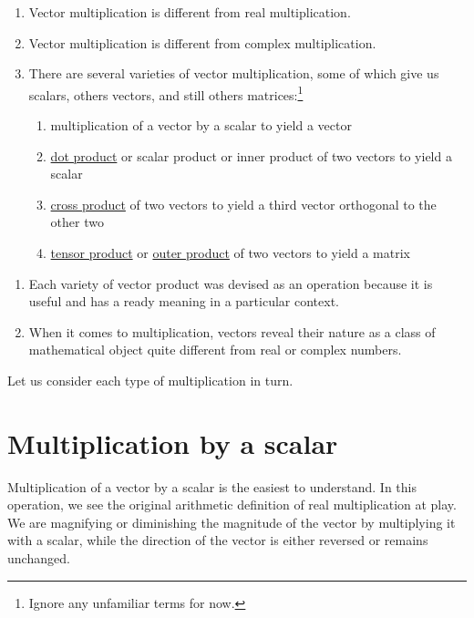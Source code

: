 \documentclass[
  a4paper,
]{article}
\providecommand{\tightlist}{%
  \setlength{\itemsep}{0pt}\setlength{\parskip}{0pt}}
\begin{document}
\begin{enumerate}
\def\labelenumi{\arabic{enumi}.}
\item
  Vector multiplication is different from real multiplication.
\item
  Vector multiplication is different from complex multiplication.
\item
  There are several varieties of vector multiplication, some of which
  give us scalars, others vectors, and still others matrices:\footnote{Ignore
    any unfamiliar terms for now.}

  \begin{enumerate}
  \def\labelenumii{(\alph{enumii})}
  \tightlist
  \item
    multiplication of a vector by a scalar to yield a vector
  \item
    \href{http://mathworld.wolfram.com/DotProduct.html}{dot product} or
    scalar product or inner product of two vectors to yield a scalar
  \item
    \href{http://mathworld.wolfram.com/CrossProduct.html}{cross product}
    of two vectors to yield a third vector orthogonal to the other two
  \item
    \href{http://en.wikipedia.org/wiki/Tensor_product}{tensor product}
    or \href{http://en.wikipedia.org/wiki/Outer_product}{outer product}
    of two vectors to yield a matrix
  \end{enumerate}
\end{enumerate}

\begin{enumerate}
\def\labelenumi{\arabic{enumi}.}
\setcounter{enumi}{3}
\item
  Each variety of vector product was devised as an operation because it
  is useful and has a ready meaning in a particular context.
\item
  When it comes to multiplication, vectors reveal their nature as a
  class of mathematical object quite different from real or complex
  numbers.
\end{enumerate}

Let us consider each type of multiplication in turn.

\hypertarget{multiplication-by-a-scalar}{%
\section{Multiplication by a scalar}\label{multiplication-by-a-scalar}}

Multiplication of a vector by a scalar is the easiest to understand. In
this operation, we see the original arithmetic definition of real
multiplication at play. We are magnifying or diminishing the magnitude
of the vector by multiplying it with a scalar, while the direction of
the vector is either reversed or remains unchanged.
\end{document}
